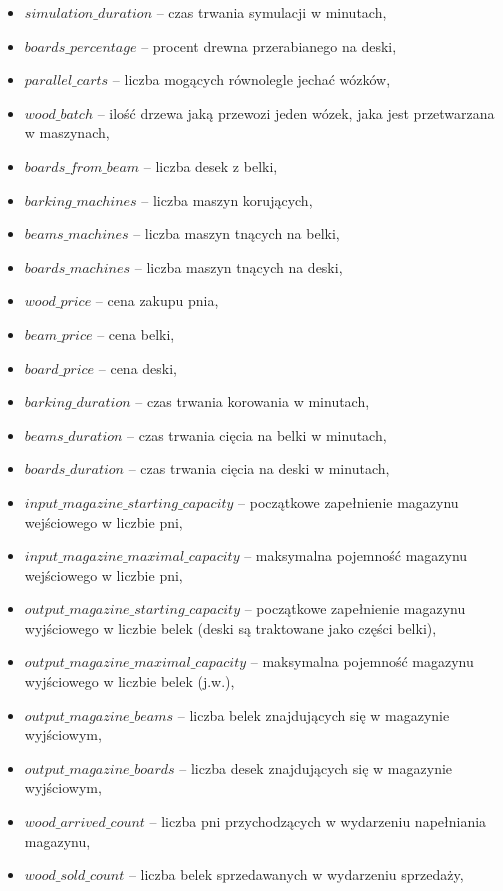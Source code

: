 \documentclass[a4paper]{article}
\begin{document}
\begin{itemize}
\item $simulation\_duration$ -- czas trwania symulacji w minutach,
\item $boards\_percentage$ -- procent drewna przerabianego na deski,
\item $parallel\_carts$ -- liczba mogących równolegle jechać wózków,
\item $wood\_batch$ -- ilość drzewa jaką przewozi jeden wózek, jaka jest przetwarzana w maszynach,
\item $boards\_from\_beam$ -- liczba desek z belki,
\item $barking\_machines$ -- liczba maszyn korujących,
\item $beams\_machines$ -- liczba maszyn tnących na belki,
\item $boards\_machines$ -- liczba maszyn tnących na deski,
\item $wood\_price$ -- cena zakupu pnia,
\item $beam\_price$ -- cena belki,
\item $board\_price$ -- cena deski,
\item $barking\_duration$ -- czas trwania korowania w minutach,
\item $beams\_duration$ -- czas trwania cięcia na belki w minutach,
\item $boards\_duration$ -- czas trwania cięcia na deski w minutach,
\item $input\_magazine\_starting\_capacity$ -- początkowe zapełnienie magazynu wejściowego w liczbie pni,
\item $input\_magazine\_maximal\_capacity$ -- maksymalna pojemność magazynu wejściowego w liczbie pni,
\item $output\_magazine\_starting\_capacity$ -- początkowe zapełnienie magazynu wyjściowego w liczbie belek (deski są traktowane jako części belki),
\item $output\_magazine\_maximal\_capacity$ -- maksymalna pojemność magazynu wyjściowego w liczbie belek (j.w.),
\item $output\_magazine\_beams$ -- liczba belek znajdujących się w magazynie wyjściowym,
\item $output\_magazine\_boards$ -- liczba desek znajdujących się w magazynie wyjściowym,
\item $wood\_arrived\_count$ -- liczba pni przychodzących w wydarzeniu napełniania magazynu,
\item $wood\_sold\_count$ -- liczba belek sprzedawanych w wydarzeniu sprzedaży,

\end{itemize}
\end{document}
